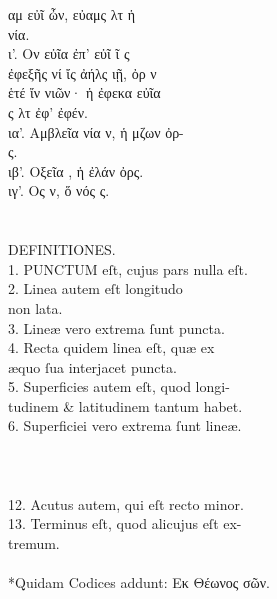 \begin{typeLatin}
αμ εὐῖ ὦν, εὐαμς λτ ἡ \\
νία. \\
ι'. Ον  εὐῖα ἐπ' εὐῖ ῖ ς \\
ἐφεξῆς νί ἴς ἀήλς ιῇ, ὀρ ν \\
ἑτέ  ἴν νιῶν·  ἡ ἐφεκα εὐῖα \\
ς λτ ἐφ'  ἐφέν. \\
ια'. Αμβλεῖα νία ν, ἡ μζων ὀρ- \\
ς. \\
ιβ'. Οξεῖα , ἡ ἐλάν ὀρς. \\
ιγ'. Ος ν, ὅ νός  ς. \\
\\
\\
DEFINITIONES.\\
1. PUNCTUM eſt, cujus pars nulla eſt.\\
2. Linea autem eſt longitudo\\
non lata.\\
3. Lineæ vero extrema ſunt puncta.\\
4. Recta quidem linea eſt, quæ ex\\
æquo ſua interjacet puncta.\\
5. Superficies autem eſt, quod longi-\\
tudinem & latitudinem tantum habet.\\
6. Superficiei vero extrema ſunt lineæ.\\
\\\untranscribedText \\ \\
12. Acutus autem, qui eſt recto minor.\\
13. Terminus eſt, quod alicujus eſt ex-\\
tremum.\\
 \\
 *\bold{>}Quidam Codices addunt: Εκ  Θέωνος σῶν. \\
\end{typeLatin}

